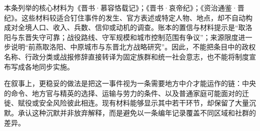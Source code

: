 本条列举的核心材料为《晋书·慕容恪载记》；《晋书·哀帝纪》；《资治通鉴·晋纪》。这些材料较适合钉住事件的发生、官方表述或特定人物、地点，却不自动构成对全境人口、收入、兵数、信仰或动机的调查。账本的置信与材料提示是“取洛阳与东晋失守可靠；战役路线、守军规模和城市控制范围有争议”；来源限度进一步说明“前燕取洛阳、中原城市与东晋北方战略研究”。因此，不能把条目中的政权名称、行政分类或战报修辞直接转译为固定族群和统一社会意志，也不能将制度宣布写成各地同步实施。

在叙事上，更稳妥的做法是把这一事件视为一条需要地方中介才能运作的链：中央的命令、地方官与精英的选择、运输与劳力的条件、以及普通家庭可能面对的迁徙、赋役或安全风险彼此相连。现有材料能够显示其中若干环节，却保留了大量沉默。承认这种沉默并非放弃解释，而是避免以一条编年记录覆盖不同区域和社群的差异。
